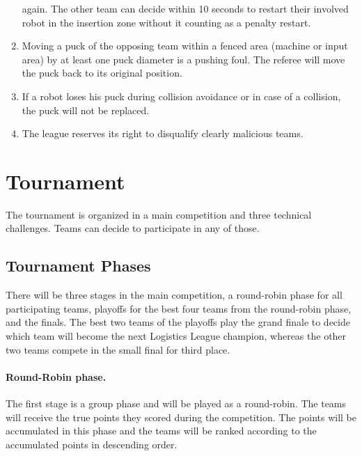 \documentclass[12pt,twoside]{article}
\begin{document}
\begin{enumerate}
  again. The other team can decide within 10 seconds to restart their
  involved robot in the insertion zone without it counting as a
  penalty restart.
\item Moving a puck of the opposing team within a fenced area (machine
  or input area) by at least one puck diameter is a pushing foul. The
  referee will move the puck back to its original position.
\item If a robot loses his puck during collision avoidance or in case
  of a collision, the puck will not be replaced.
\item The league reserves its right to disqualify clearly malicious
  teams.
\end{enumerate}

\section{Tournament}
\label{sec:tournament}
The tournament is organized in a main competition and three technical challenges.
Teams can decide to participate in any of those.

\subsection{Tournament Phases}
\label{sec:tournament-phases}
There will be three stages in the main competition, a round-robin phase for
all participating teams, playoffs for the best four teams from the
round-robin phase, and the finals. The best two teams of the playoffs
play the grand finale to decide which team will become the next Logistics 
League champion, whereas the other two teams compete in the small final for 
third place.

\paragraph{Round-Robin phase.~} 
The first stage is a group phase and will be played as a round-robin.
The teams will receive the true points they scored during the competition. 
The points will be accumulated in this phase and the teams will be ranked 
according to the accumulated points in descending order.
\end{document}
